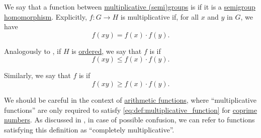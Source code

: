 \begin{definition}\label{def:multiplicative_function}\mimprovised
  We say that a function between \hyperref[con:additive_semigroup]{multiplicative (semi)groups} is  if it is a \hyperref[def:semigroup/homomorphism]{semigroup homomorphism}. Explicitly, \( f: G \to H \) is multiplicative if, for all \( x \) and \( y \) in \( G \), we have
  \begin{equation}\label{eq:def:multiplicative_function}
    f(xy) = f(x) \cdot f(y).
  \end{equation}

  \begin{thmenum}
     Analogously to , if \( H \) is \hyperref[def:ordered_semigroup]{ordered}, we say that \( f \) is  if
    \begin{equation}\label{eq:def:multiplicative_function/sub}
      f(xy) \leq f(x) \cdot f(y).
    \end{equation}

     Similarly, we say that \( f \) is  if
    \begin{equation}\label{eq:def:multiplicative_function/super}
      f(xy) \geq f(x) \cdot f(y).
    \end{equation}
  \end{thmenum}
\end{definition}
\begin{comments}
  \item We should be careful in the context of \hyperref[def:arithmetic_function]{arithmetic functions}, where \enquote{multiplicative functions} are only required to satisfy \eqref{eq:def:multiplicative_function} for \hyperref[def:coprime_numbers]{coprime numbers}. As discussed in , in case of possible confusion, we can refer to functions satisfying this definition as \enquote{completely multiplicative}.
\end{comments}

